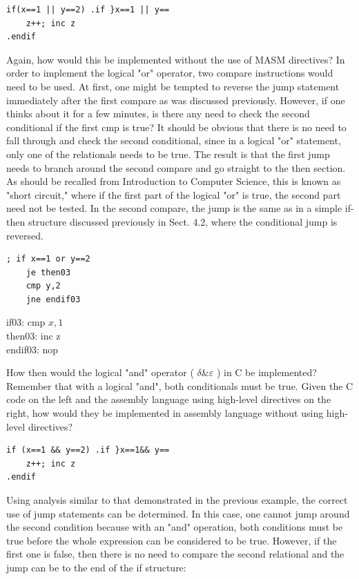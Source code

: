 \documentclass[10pt]{book}
\begin{document}
\begin{verbatim}
if(x==1 || y==2) .if }x==1 || y==
    z++; inc z
.endif
\end{verbatim}

Again, how would this be implemented without the use of MASM directives? In order to implement the logical "or" operator, two compare instructions would need to be used. At first, one might be tempted to reverse the jump statement immediately after the first compare as was discussed previously. However, if one thinks about it for a few minutes, is there any need to check the second conditional if the first cmp is true? It should be obvious that there is no need to fall through and check the second conditional, since in a logical "or" statement, only one of the relationals needs to be true. The result is that the first jump needs to branch around the second compare and go straight to the then section. As should be recalled from Introduction to Computer Science, this is known as "short circuit," where if the first part of the logical "or" is true, the second part need not be tested. In the second compare, the jump is the same as in a simple if-then structure discussed previously in Sect. 4.2, where the conditional jump is reversed.

\begin{verbatim}
; if x==1 or y==2
    je then03
    cmp y,2
    jne endif03
\end{verbatim}

if03: cmp $x, 1$\\
then03: inc z\\
endif03: nop

How then would the logical "and" operator ( $\delta \& \varepsilon$ ) in C be implemented? Remember that with a logical "and", both conditionals must be true. Given the C code on the left and the assembly language using high-level directives on the right, how would they be implemented in assembly language without using high-level directives?


\begin{verbatim}
if (x==1 && y==2) .if }x==1&& y==
    z++; inc z
.endif
\end{verbatim}

Using analysis similar to that demonstrated in the previous example, the correct use of jump statements can be determined. In this case, one cannot jump around the second condition because with an "and" operation, both conditions must be true before the whole expression can be considered to be true. However, if the first one is false, then there is no need to compare the second relational and the jump can be to the end of the if structure:
\end{document}
